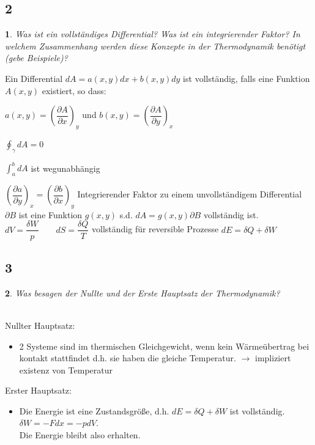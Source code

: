 \documentclass[12pt,a4paper]{report}
\newtheorem{myfrag}{}%
\begin{document}
\subsection{2}
\begin{myfrag}
Was ist ein vollständiges Differential? Was ist ein integrierender Faktor?
In welchem Zusammenhang werden diese Konzepte in der
Thermodynamik benötigt (gebe Beispiele)?
\end{myfrag} \qquad \newline
Ein Differential $dA = a(x,y)dx+b(x,y)dy$ ist vollständig, falls eine Funktion $A(x,y)$ existiert, so dass:
\begin{compactenum}[(i)]
\item $a(x,y) = \left(\dfrac{\partial A}{\partial x} \right) _y $ und $b(x,y) = \left( \dfrac{\partial A}{\partial y} \right) _x $
\item $\oint_\gamma dA = 0 $
\item $\int_a^b dA $ ist wegunabhängig
\item $\left(\dfrac{\partial a}{\partial y} \right) _x = \left(\dfrac{\partial b}{\partial x} \right) _y $
Integrierender Faktor zu einem unvollständigem Differential $\partial B$ ist eine Funktion $g(x,y)$ s.d. $dA = g(x,y)\partial B $ vollständig ist. \newline
$ dV = \dfrac{\delta W}{p} \qquad dS = \dfrac{\delta Q}{T}$ \quad vollständig für reversible Prozesse 
$ dE = \delta Q + \delta W$
\end{compactenum}
\subsection{3}
\begin{myfrag}
Was besagen der Nullte und der Erste Hauptsatz der Thermodynamik?
\end{myfrag} \quad \\
Nullter Hauptsatz:
\begin{itemize}
\item 2 Systeme sind im thermischen Gleichgewicht, wenn kein Wärmeübertrag bei kontakt stattfindet d.h. sie haben die gleiche Temperatur.
$\rightarrow$ impliziert existenz von Temperatur
\end{itemize}
Erster Hauptsatz:
\begin{itemize}
\item Die Energie ist eine Zustandsgröße, d.h. $dE= \delta Q + \delta W $ ist vollständig. $ \delta W = -Fdx = -pdV$.\\
Die Energie bleibt also erhalten.
\end{itemize}
\end{document}
